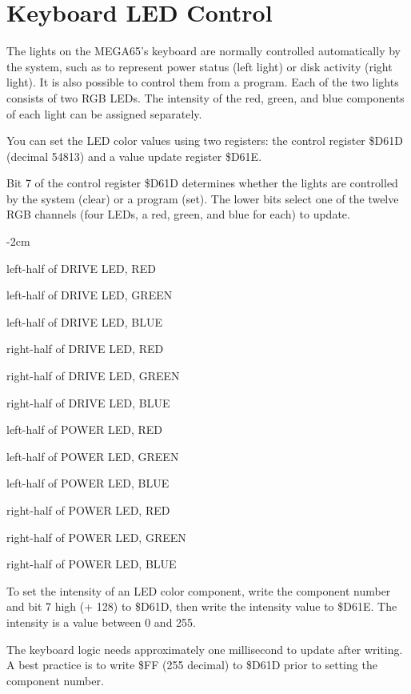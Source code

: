\section{Keyboard LED Control}

The lights on the MEGA65's keyboard are normally controlled automatically by the system, such as to represent power status (left light) or disk activity (right light). It is also possible to control them from a program. Each of the two lights consists of two RGB LEDs. The intensity of the red, green, and blue components of each light can be assigned separately.

You can set the LED color values using two registers: the control register \$D61D (decimal 54813) and a value update register \$D61E.

Bit 7 of the control register \$D61D determines whether the lights are controlled by the system (clear) or a program (set). The lower bits select one of the twelve RGB channels (four LEDs, a red, green, and blue for each) to update.

\begin{adjustwidth}{}{-2cm}
\begin{description}[align=left,labelwidth=0.2cm]
\item[ 0] left-half of DRIVE LED, RED
\item[ 1] left-half of DRIVE LED, GREEN
\item[ 2] left-half of DRIVE LED, BLUE
\item[ 3] right-half of DRIVE LED, RED
\item[ 4] right-half of DRIVE LED, GREEN
\item[ 5] right-half of DRIVE LED, BLUE
\item[ 6] left-half of POWER LED, RED
\item[ 7] left-half of POWER LED, GREEN
\item[ 8] left-half of POWER LED, BLUE
\item[ 9] right-half of POWER LED, RED
\item[10] right-half of POWER LED, GREEN
\item[11] right-half of POWER LED, BLUE
\end{description}
\end{adjustwidth}

To set the intensity of an LED color component, write the component number and bit 7 high (+ 128) to \$D61D, then write the intensity value to \$D61E. The intensity is a value between 0 and 255.

The keyboard logic needs approximately one millisecond to update after writing. A best practice is to write \$FF (255 decimal) to \$D61D prior to setting the component number.

